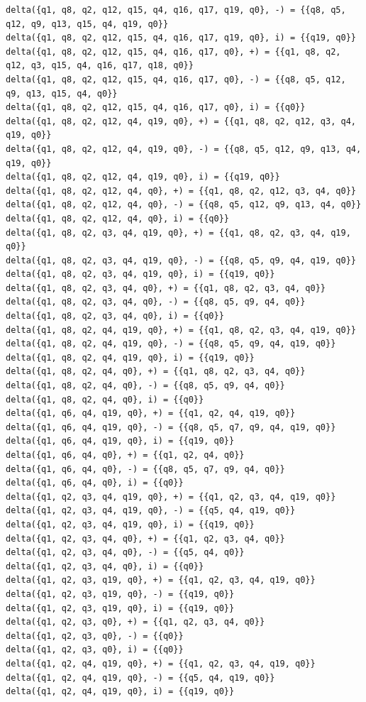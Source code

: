 \documentclass[12pt,a4paper]{report}
\begin{document}
\begin{lstlisting}
delta({q1, q8, q2, q12, q15, q4, q16, q17, q19, q0}, -) = {{q8, q5, q12, q9, q13, q15, q4, q19, q0}}
delta({q1, q8, q2, q12, q15, q4, q16, q17, q19, q0}, i) = {{q19, q0}}
delta({q1, q8, q2, q12, q15, q4, q16, q17, q0}, +) = {{q1, q8, q2, q12, q3, q15, q4, q16, q17, q18, q0}}
delta({q1, q8, q2, q12, q15, q4, q16, q17, q0}, -) = {{q8, q5, q12, q9, q13, q15, q4, q0}}
delta({q1, q8, q2, q12, q15, q4, q16, q17, q0}, i) = {{q0}}
delta({q1, q8, q2, q12, q4, q19, q0}, +) = {{q1, q8, q2, q12, q3, q4, q19, q0}}
delta({q1, q8, q2, q12, q4, q19, q0}, -) = {{q8, q5, q12, q9, q13, q4, q19, q0}}
delta({q1, q8, q2, q12, q4, q19, q0}, i) = {{q19, q0}}
delta({q1, q8, q2, q12, q4, q0}, +) = {{q1, q8, q2, q12, q3, q4, q0}}
delta({q1, q8, q2, q12, q4, q0}, -) = {{q8, q5, q12, q9, q13, q4, q0}}
delta({q1, q8, q2, q12, q4, q0}, i) = {{q0}}
delta({q1, q8, q2, q3, q4, q19, q0}, +) = {{q1, q8, q2, q3, q4, q19, q0}}
delta({q1, q8, q2, q3, q4, q19, q0}, -) = {{q8, q5, q9, q4, q19, q0}}
delta({q1, q8, q2, q3, q4, q19, q0}, i) = {{q19, q0}}
delta({q1, q8, q2, q3, q4, q0}, +) = {{q1, q8, q2, q3, q4, q0}}
delta({q1, q8, q2, q3, q4, q0}, -) = {{q8, q5, q9, q4, q0}}
delta({q1, q8, q2, q3, q4, q0}, i) = {{q0}}
delta({q1, q8, q2, q4, q19, q0}, +) = {{q1, q8, q2, q3, q4, q19, q0}}
delta({q1, q8, q2, q4, q19, q0}, -) = {{q8, q5, q9, q4, q19, q0}}
delta({q1, q8, q2, q4, q19, q0}, i) = {{q19, q0}}
delta({q1, q8, q2, q4, q0}, +) = {{q1, q8, q2, q3, q4, q0}}
delta({q1, q8, q2, q4, q0}, -) = {{q8, q5, q9, q4, q0}}
delta({q1, q8, q2, q4, q0}, i) = {{q0}}
delta({q1, q6, q4, q19, q0}, +) = {{q1, q2, q4, q19, q0}}
delta({q1, q6, q4, q19, q0}, -) = {{q8, q5, q7, q9, q4, q19, q0}}
delta({q1, q6, q4, q19, q0}, i) = {{q19, q0}}
delta({q1, q6, q4, q0}, +) = {{q1, q2, q4, q0}}
delta({q1, q6, q4, q0}, -) = {{q8, q5, q7, q9, q4, q0}}
delta({q1, q6, q4, q0}, i) = {{q0}}
delta({q1, q2, q3, q4, q19, q0}, +) = {{q1, q2, q3, q4, q19, q0}}
delta({q1, q2, q3, q4, q19, q0}, -) = {{q5, q4, q19, q0}}
delta({q1, q2, q3, q4, q19, q0}, i) = {{q19, q0}}
delta({q1, q2, q3, q4, q0}, +) = {{q1, q2, q3, q4, q0}}
delta({q1, q2, q3, q4, q0}, -) = {{q5, q4, q0}}
delta({q1, q2, q3, q4, q0}, i) = {{q0}}
delta({q1, q2, q3, q19, q0}, +) = {{q1, q2, q3, q4, q19, q0}}
delta({q1, q2, q3, q19, q0}, -) = {{q19, q0}}
delta({q1, q2, q3, q19, q0}, i) = {{q19, q0}}
delta({q1, q2, q3, q0}, +) = {{q1, q2, q3, q4, q0}}
delta({q1, q2, q3, q0}, -) = {{q0}}
delta({q1, q2, q3, q0}, i) = {{q0}}
delta({q1, q2, q4, q19, q0}, +) = {{q1, q2, q3, q4, q19, q0}}
delta({q1, q2, q4, q19, q0}, -) = {{q5, q4, q19, q0}}
delta({q1, q2, q4, q19, q0}, i) = {{q19, q0}}

\end{lstlisting}
\end{document}
